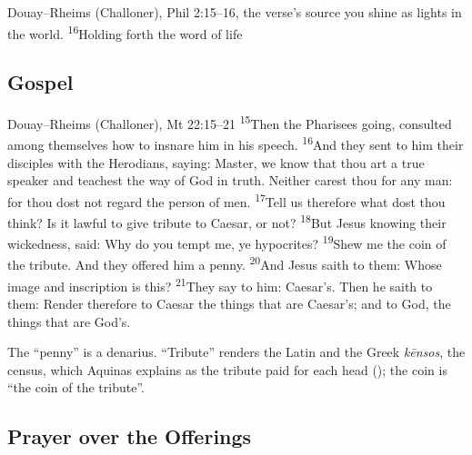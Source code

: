\begin{englishwitness}{Douay--Rheims (Challoner), Phil 2:15--16, the verse's source}
 you shine as lights in the world. \textsuperscript{16}Holding forth the
word of life 
\end{englishwitness}

\subsection{Gospel}
\label{proper-gospel}


\begin{englishwitness}{Douay--Rheims (Challoner), Mt 22:15--21}
\textsuperscript{15}Then the Pharisees going, consulted among themselves how to
insnare him in his speech. \textsuperscript{16}And they sent to him their
disciples with the Herodians, saying: Master, we know that thou art a true
speaker and teachest the way of God in truth. Neither carest thou for any man:
for thou dost not regard the person of men. \textsuperscript{17}Tell us
therefore what dost thou think? Is it lawful to give tribute to Caesar, or
not? \textsuperscript{18}But Jesus knowing their wickedness, said: Why do you
tempt me, ye hypocrites? \textsuperscript{19}Shew me the coin of the tribute.
And they offered him a penny. \textsuperscript{20}And Jesus saith to them:
Whose image and inscription is this? \textsuperscript{21}They say to him:
Caesar's. Then he saith to them: Render therefore to Caesar the things that are
Caesar's; and to God, the things that are God's.
\end{englishwitness}

\noindent The ``penny'' is a denarius. ``Tribute'' renders the Latin
 and the Greek \textit{k\=ensos}, the census, which Aquinas
explains as the tribute paid for each head (); the coin is ``the coin of the tribute''.

\subsection{Prayer over the Offerings}
\label{proper-prayer-over-offerings}

